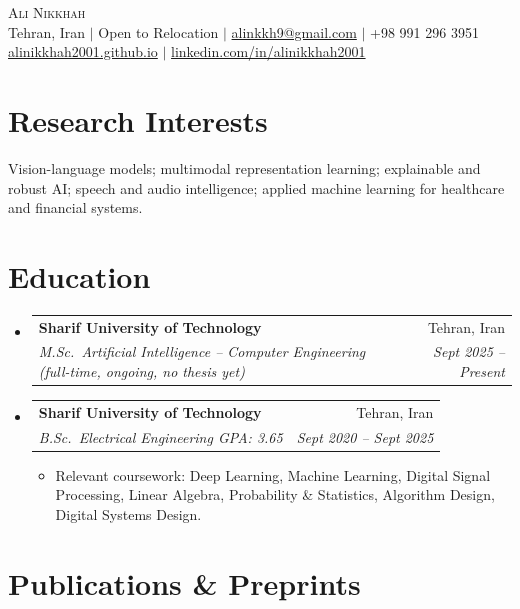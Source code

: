 \documentclass[letterpaper,11pt]{article}
\makeatletter
\newcommand{\resumeItem}[1]{
  \item\small{#1 \vspace{-2pt}}
}
\newcommand{\resumeSubheading}[4]{
  \vspace{-2pt}\item
  \begin{tabular*}{0.97\textwidth}[t]{l@{\extracolsep{\fill}}r}
    \textbf{#1} & \small #2 \\
    \textit{\small#3} & \textit{\small #4} \\
  \end{tabular*}\vspace{-7pt}
}
\newenvironment{resumeSubHeadingList}{\begin{itemize}[leftmargin=0.15in, label={}]}{\end{itemize}}
\newenvironment{resumeItemList}{\begin{itemize}[leftmargin=0.2in]}{\end{itemize}\vspace{-5pt}}
\makeatother
\begin{document}
\begin{center}
  \Huge \textsc{Ali Nikkhah} \\ \vspace{2pt}
  \small
  Tehran, Iran $|$ Open to Relocation $|$
  \href{mailto:alinkkh9@gmail.com}{alinkkh9@gmail.com} $|$
  +98 991 296 3951 \\
  \href{https://alinikkhah2001.github.io}{alinikkhah2001.github.io} $|$
  \href{https://linkedin.com/in/alinikkhah2001}{linkedin.com/in/alinikkhah2001}
\end{center}

\section{Research Interests}
\small{Vision-language models; multimodal representation learning; explainable and robust AI; speech and audio intelligence; applied machine learning for healthcare and financial systems.}
\vspace{4pt}

\section{Education}
\begin{resumeSubHeadingList}
  \resumeSubheading
    {Sharif University of Technology}{Tehran, Iran}
    {M.Sc.\ Artificial Intelligence -- Computer Engineering (full-time, ongoing, no thesis yet)}{Sept 2025 -- Present}
  \resumeSubheading
    {Sharif University of Technology}{Tehran, Iran}
    {B.Sc.\ Electrical Engineering \quad GPA: 3.65}{Sept 2020 -- Sept 2025}
  \begin{resumeItemList}
    \resumeItem{Relevant coursework: Deep Learning, Machine Learning, Digital Signal Processing, Linear Algebra, Probability \& Statistics, Algorithm Design, Digital Systems Design.}
  \end{resumeItemList}
\end{resumeSubHeadingList}

\section{Publications \& Preprints}
\begin{itemize}[leftmargin=0.15in, label={}]
  
\end{itemize}

\end{document}
